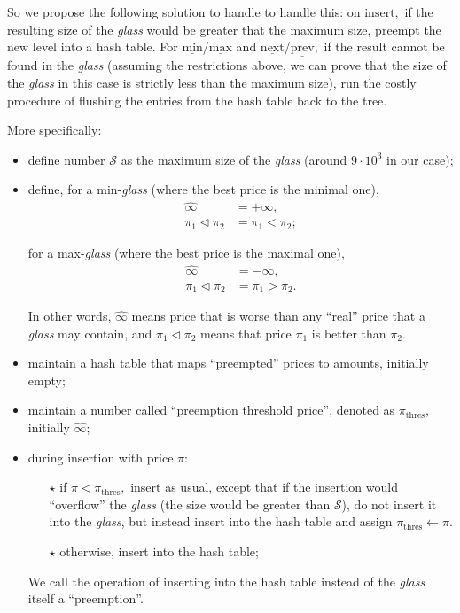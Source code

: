 \documentclass[a4paper,12pt]{article}
\newcommand{\PriceBetter}{\vartriangleleft}
\newcommand{\PriceBetterEq}{\trianglelefteq}
\begin{document}
So we propose the following solution to handle to handle this:
on $\underline{\mathrm{insert}},$ if the resulting size of the \textit{glass} would be greater that the maximum size,
preempt the new level into a hash table.
For $\underline{\mathrm{min}}$/$\underline{\mathrm{max}}$ and $\underline{\mathrm{next}}$/$\underline{\mathrm{prev}},$
if the result cannot be found in the \textit{glass} (assuming the restrictions above, we can prove that the size of the \textit{glass} in this case is strictly less than the maximum size),
run the costly procedure of flushing the entries from the hash table back to the tree.

More specifically:
\begin{itemize}
    \item define number $\mathcal{S}$ as the maximum size of the \textit{glass} (around $9 \cdot 10^3$ in our case);
    \item define, for a min-\textit{glass} (where the best price is the minimal one),
        \begin{align*}
            \widehat \infty       & = + \infty, \\
            \pi_1 \PriceBetter \pi_2 & = \pi_1 < \pi_2;
        \end{align*}

        for a max-\textit{glass} (where the best price is the maximal one),
        \begin{align*}
            \widehat \infty       & = - \infty, \\
            \pi_1 \PriceBetter \pi_2 & = \pi_1 > \pi_2.
        \end{align*}

        In other words, $\widehat \infty$ means price that is worse than any ``real'' price that a \textit{glass} may contain,
        and $\pi_1 \PriceBetter \pi_2$ means that price $\pi_1$ is better than $\pi_2.$


    \item maintain a hash table that maps ``preempted'' prices to amounts, initially empty;
    \item maintain a number called ``preemption threshold price'', denoted as $\pi_\mathrm{thres}$, initially $\widehat \infty$;

    \item during insertion with price $\pi$:
        \begin{itemize}
            \item[$\star$] if $\pi \PriceBetter \pi_\mathrm{thres},$ insert as usual, except that if the insertion would ``overflow'' the \textit{glass} (the size would be greater than $\mathcal{S}$),
            do not insert it into the \textit{glass}, but instead insert into the hash table and assign $\pi_\mathrm{thres} \longleftarrow \pi.$
            \item[$\star$] otherwise, insert into the hash table;
        \end{itemize}
        We call the operation of inserting into the hash table instead of the \textit{glass} itself a ``preemption''.


\end{itemize}
\end{document}
